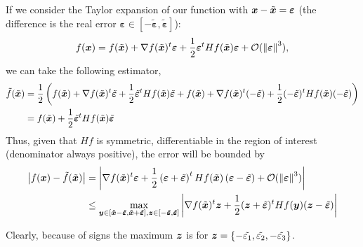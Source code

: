 \documentclass[]{amsart}
\newcommand{\verr}{\boldsymbol{\varepsilon}}
\newcommand{\tverr}{\tilde{\boldsymbol{\varepsilon}}}
\begin{document}
If we consider the Taylor expansion of our function with $\vx-\tvx=\verr$ (the difference is the real error $\verr\in[-\tverr,\tverr]$):
\begin{equation}
f(\vx)=f(\tvx)+\nabla f(\tvx)^t\verr+\frac{1}{2}\verr^t Hf(\tvx) \verr + \mathcal{O}(\norm{\verr}^3),
\end{equation}
we can take the following estimator,
\begin{align*}
\tf(\tvx)&=\frac{1}{2}\left(f(\tvx)+\nabla f(\tvx)^t\tverr+\frac{1}{2}\tverr^t Hf(\tvx) \tverr + f(\tvx)+\nabla f(\tvx)^t(-\tverr)+\frac{1}{2}(-\tverr)^t Hf(\tvx) (-\tverr) \right)\\
&=f(\tvx)+\frac{1}{2}\tverr^t Hf(\tvx) \tverr
\end{align*}
Thus, given that $Hf$ is symmetric, differentiable in the region of interest (denominator always positive), the error will be bounded by
\begin{align*}
\abs{f(\vx)-\tf(\tvx)}&=\abs{\nabla f(\tvx)^t\verr+\frac{1}{2}\left(\verr+\tverr\right)^t Hf(\tvx) \left(\verr-\tverr\right) + \mathcal{O}(\norm{\verr}^3)} \\
&\leq \max_{\vy\in[\tvx-\tverr,\tvx+\tverr], \vz\in[-\tverr,\tverr]}\abs{\nabla f(\tvx)^t\vz+\frac{1}{2}(\vz+\tverr)^t Hf(\vy)(\vz-\tverr)}
\end{align*}

Clearly, because of signs the maximum $\boldsymbol{z}$ is for $\boldsymbol{z}=\{-\tilde{\varepsilon_1},\tilde{\varepsilon_2},-\tilde{\varepsilon_3}\}$.
\end{document}
